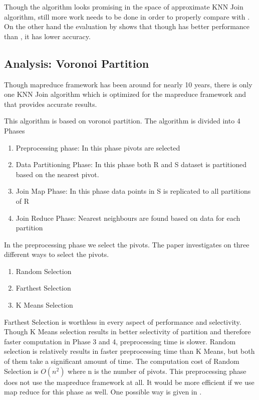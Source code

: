 \documentclass[conference]{IEEEtran}
\begin{document}
Though the algorithm looks promising in the space of approximate KNN
Join algorithm, still more work needs to be done in order to properly
compare with \cite{zhang_efficient_2012}. On the other hand the
evaluation by \cite{song_solutions_2015} shows that though
\cite{zhang_efficient_2012} has better performance than
\cite{stupar_rankreduceprocessing_2010}, it has lower accuracy.

\bigskip

\subsection{Analysis: Voronoi Partition}
Though mapreduce framework has been around for nearly 10 years, there
is only one KNN Join algorithm \cite{lu_efficient_2012} which is
optimized for the mapreduce framework and that provides accurate
results.

\medskip

This algorithm is based on voronoi partition. The algorithm is
divided into 4 Phases
\begin{enumerate}
\item Preprocessing phase: In this phase pivots are selected
\item Data Partitioning Phase: In this phase both R and S dataset is
  partitioned based on the nearest pivot.
\item Join Map Phase: In this phase data points in S is replicated to
  all partitions of R
\item Join Reduce Phase: Nearest neighbours are found based on data
  for each partition
\end{enumerate}

\bigskip

In the preprocessing phase we select the pivots. The paper
investigates on three different ways to select the pivots.
\begin{enumerate}
\item Random Selection
\item Farthest Selection
\item K Means Selection
\end{enumerate}

\medskip

Farthest Selection is worthless in every aspect of performance and
selectivity. Though K Means selection results in better selectivity of partition
and therefore faster computation in Phase 3 and 4, preprocessing time
is slower. Random selection is relatively results in faster
preprocessing time than K Means, but both of them take a significant
amount of time. The computation cost of Random Selection is $O(n^2)$
where n is the number of pivots. This preprocessing phase does not use the
mapreduce framework at all. It would be more efficient if we use map
reduce for this phase as well. One possible way is given in
\cite{kiefer_pairwise_2010}.
\end{document}
